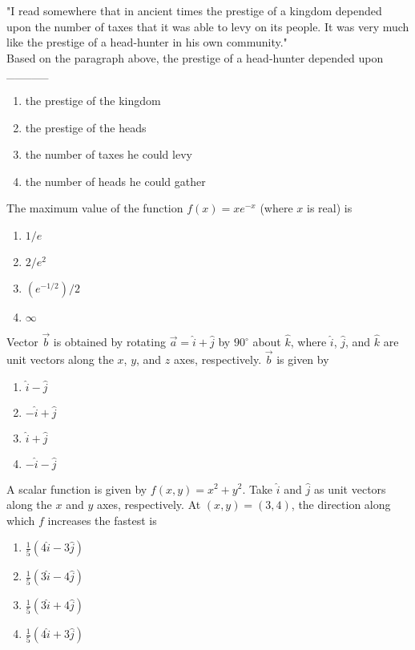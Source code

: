     \item "I read somewhere that in ancient times the prestige of a kingdom depended upon the number of taxes that it was able to levy on its people. It was very much like the prestige of a head-hunter in his own community." \\
    Based on the paragraph above, the prestige of a head-hunter depended upon \_\_\_\_\_
    \begin{enumerate}
        \item the prestige of the kingdom
        \item the prestige of the heads
        \item the number of taxes he could levy
        \item the number of heads he could gather
    \end{enumerate}

\item The maximum value of the function $f(x) = xe^{-x}$ (where $x$ is real) is
    \begin{enumerate}
        \item $1/e$
        \item $2/e^2$
        \item $(e^{-1/2})/2$
        \item $\infty$
    \end{enumerate}
    
    \item Vector $\vec{b}$ is obtained by rotating $\vec{a} = \hat{i} + \hat{j}$ by $90^\circ$ about $\hat{k}$, where $\hat{i}$, $\hat{j}$, and $\hat{k}$ are unit vectors along the $x$, $y$, and $z$ axes, respectively. $\vec{b}$ is given by
    \begin{enumerate}
        \item $\hat{i} - \hat{j}$
        \item $-\hat{i} + \hat{j}$
        \item $\hat{i} + \hat{j}$
        \item $-\hat{i} - \hat{j}$
    \end{enumerate}
    
    \item A scalar function is given by $f(x, y) = x^2 + y^2$. Take $\hat{i}$ and $\hat{j}$ as unit vectors along the $x$ and $y$ axes, respectively. At $(x, y) = (3, 4)$, the direction along which $f$ increases the fastest is
    \begin{enumerate}
        \item $\frac{1}{5}(4\hat{i} - 3\hat{j})$
        \item $\frac{1}{5}(3\hat{i} - 4\hat{j})$
        \item $\frac{1}{5}(3\hat{i} + 4\hat{j})$
        \item $\frac{1}{5}(4\hat{i} + 3\hat{j})$
    \end{enumerate}

